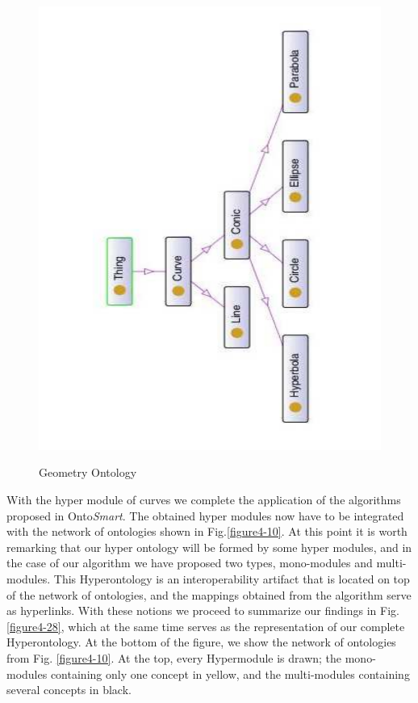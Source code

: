 \begin{figure}
\begin{center}
	\includegraphics[scale=0.5, angle=270]{figure-chapterIV/fig4-27}\\
	\vspace{-20mm}
	\caption{Geometry Ontology}
	\label{figure4-27}
\end{center}
\end{figure}




With the hyper module of curves we complete the application of the algorithms proposed in Onto\textit{Smart}. The obtained hyper modules now have to be integrated with the network of ontologies shown in Fig.\ref{figure4-10}. At this point it is worth remarking that our hyper ontology will be formed by some hyper modules, and in the case of our algorithm we have proposed two types, mono-modules and multi-modules. This Hyperontology is an interoperability artifact that is located on top of the network of ontologies, and the mappings obtained from the algorithm serve as hyperlinks. With these notions we proceed to summarize our findings in Fig. \ref{figure4-28}, which at the same time serves as the representation of our complete Hyperontology. At the bottom of the figure, we show the network of ontologies from Fig. \ref{figure4-10}. At the top, every Hypermodule is drawn; the mono-modules containing only one concept in yellow, and the multi-modules containing several concepts in black. 


